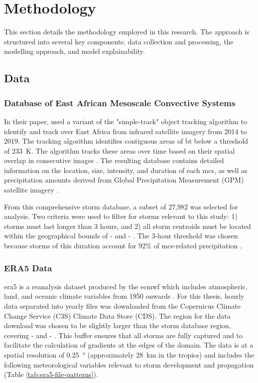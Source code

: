 \chapter{Methodology}
\label{ch:method}

This section details the methodology employed in this research. The approach is structured into several key components: data collection and processing, the modelling approach, and model explainability.

\section{Data}

\subsection{Database of East African Mesoscale Convective Systems}

In their paper, \cite{Hill2023} used a variant of the "simple-track" object tracking algorithm to identify and track  over East Africa from infrared satellite imagery from 2014 to 2019. The tracking algorithm identifies contiguous areas of \acrfull{bt} below a threshold of \SI{233}{\kelvin}. The algorithm tracks these areas over time based on their spatial overlap in consecutive images \citep{Stein2020}. The resulting database contains detailed information on the location, size, intensity, and duration of each \acrshort{mcs}, as well as precipitation amounts derived from Global Precipitation Measurement (GPM) satellite imagery \citep{Huffman2015}.

From this comprehensive storm database, a subset of 27,982  was selected for analysis. Two criteria were used to filter for storms relevant to this study: 1) storms must last longer than 3 hours, and 2) all storm centroids must be located within the geographical bounds of  -  and  - . The 3-hour threshold was chosen because storms of this duration account for 92\% of \acrshort{mcs}-related precipitation \citep{Hill2023}.

\subsection{ERA5 Data}
\label{sec:era5-data}

\acrshort{era5} is a reanalysis dataset produced by the \acrfull{ecmwf} which includes atmospheric, land, and oceanic climate variables from 1950 onwards \citep{Hersbach2020}. For this thesis, hourly data separated into yearly files was downloaded from the Copernicus Climate Change Service (C3S) Climate Data Store (CDS). The region for the data download was chosen to be slightly larger than the storm database region, covering  -  and  - . This buffer ensures that all storms are fully captured and to facilitate the calculation of gradients at the edges of the domain. The data is at a spatial resolution of \SI{0.25}{\degree} (approximately \SI{28}{\km} in the tropics) and includes the following meteorological variables relevant to storm development and propagation (Table \ref{tab:era5-file-patterns}).

